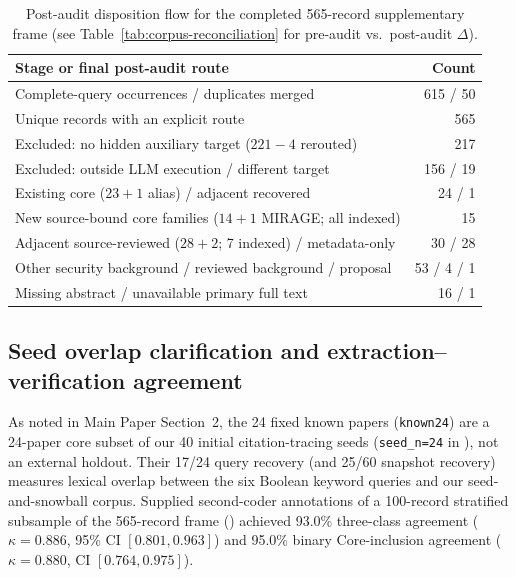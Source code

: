 \begin{table}[!ht]\centering\footnotesize
\caption{Post-audit disposition flow for the completed 565-record supplementary frame (see Table~\ref{tab:corpus-reconciliation} for pre-audit vs.\ post-audit $\Delta$).}\label{tab:finite-flow}
\begin{tabularx}{\columnwidth}{@{}Yr@{}}\toprule
Stage or final post-audit route & Count\\\midrule
Complete-query occurrences / duplicates merged & 615 / 50\\
Unique records with an explicit route & 565\\\midrule
Excluded: no hidden auxiliary target ($221-4$ rerouted) & 217\\
Excluded: outside LLM execution / different target & 156 / 19\\
Existing core ($23+1$ alias) / adjacent recovered & 24 / 1\\
New source-bound core families ($14+1$ MIRAGE; all indexed) & 15\\
Adjacent source-reviewed ($28+2$; 7 indexed) / metadata-only & 30 / 28\\
Other security background / reviewed background / proposal & 53 / 4 / 1\\
Missing abstract / unavailable primary full text & 16 / 1\\\bottomrule
\end{tabularx}\end{table}

\subsection{Seed overlap clarification and extraction--verification agreement}
As noted in Main Paper Section~2, the 24 fixed known papers (\texttt{known24}) are a 24-paper core subset of our 40 initial citation-tracing seeds (\texttt{seed\_n=24} in ), not an external holdout. Their 17/24 query recovery (and 25/60 snapshot recovery) measures lexical overlap between the six Boolean keyword queries and our seed-and-snowball corpus. Supplied second-coder annotations of a 100-record stratified subsample of the 565-record frame () achieved 93.0\% three-class agreement ($\kappa=0.886$, 95\% CI $[0.801,0.963]$) and 95.0\% binary Core-inclusion agreement ($\kappa=0.880$, CI $[0.764,0.975]$).
